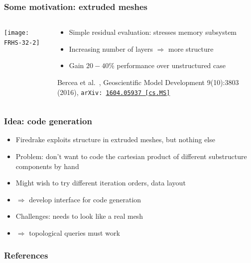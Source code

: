 \documentclass[presentation,aspectratio=43, 10pt]{beamer}
\newcommand{\arxivlink}[2]{{\texttt{arXiv:\,\href{https://arxiv.org/abs/#1}{#1\,[#2]}}}}
\begin{document}
\begin{frame}
  \frametitle{Some motivation: extruded meshes}
  \begin{columns}
    \begin{column}{0.6\textwidth}
      \texttt{[image: FRHS-32-2]}
    \end{column}
    \hspace{-1em}
    \begin{column}{0.45\textwidth}
      \begin{itemize}
      \item Simple residual evaluation: stresses memory subsystem
      \item Increasing number of layers $\Rightarrow$ more structure
      \item Gain $20-40\%$ performance over unstructured case
      \end{itemize}
      \begin{flushright}
        {\footnotesize Bercea et al.~, Geoscientific Model Development
          9(10):3803 (2016), \arxivlink{1604.05937}{cs.MS}}
      \end{flushright}
    \end{column}
  \end{columns}
\end{frame}

\begin{frame}
  \frametitle{Idea: code generation}
  \begin{itemize}
  \item Firedrake exploits structure in extruded meshes, but nothing
    else
  \item Problem: don't want to code the cartesian product of different
    substructure components by hand
  \item Might wish to try different iteration orders, data layout
    
  \item $\Rightarrow$ develop interface for code generation
  \item Challenges: needs to look like a real mesh
  \item $\Rightarrow$ topological queries must work
  \end{itemize}
\end{frame}


\appendix
\begin{frame}
  \frametitle{References}
  \printbibliography[heading=none]
\end{frame}
\end{document}
